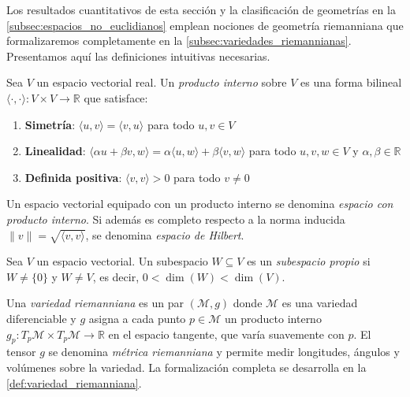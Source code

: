 Los resultados cuantitativos de esta sección y la clasificación de geometrías en la \autoref{subsec:espacios_no_euclidianos} emplean nociones de geometría riemanniana que formalizaremos completamente en la \autoref{subsec:variedades_riemannianas}. Presentamos aquí las definiciones intuitivas necesarias.

\begin{definition}\label{def:producto_interno}
Sea $V$ un espacio vectorial real. Un \textit{producto interno} sobre $V$ es una forma bilineal $\langle \cdot, \cdot \rangle: V \times V \to \mathbb{R}$ que satisface:
\begin{enumerate}
	\item \textbf{Simetría}: $\langle u, v \rangle = \langle v, u \rangle$ para todo $u, v \in V$
	\item \textbf{Linealidad}: $\langle \alpha u + \beta v, w \rangle = \alpha \langle u, w \rangle + \beta \langle v, w \rangle$ para todo $u, v, w \in V$ y $\alpha, \beta \in \mathbb{R}$
	\item \textbf{Definida positiva}: $\langle v, v \rangle > 0$ para todo $v \neq 0$
\end{enumerate}
Un espacio vectorial equipado con un producto interno se denomina \textit{espacio con producto interno}. Si además es completo respecto a la norma inducida $\|v\| = \sqrt{\langle v, v \rangle}$, se denomina \textit{espacio de Hilbert}.
\end{definition}

\begin{definition}\label{def:subespacio_propio}
Sea $V$ un espacio vectorial. Un subespacio $W \subseteq V$ es un \textit{subespacio propio} si $W \neq \{0\}$ y $W \neq V$, es decir, $0 < \dim(W) < \dim(V)$.
\end{definition}

\begin{definition}\label{def:variedad_riemanniana_preliminar}
Una \textit{variedad riemanniana} es un par $(\mathcal{M}, g)$ donde $\mathcal{M}$ es una variedad diferenciable y $g$ asigna a cada punto $p \in \mathcal{M}$ un producto interno $g_p: T_p\mathcal{M} \times T_p\mathcal{M} \to \mathbb{R}$ en el espacio tangente, que varía suavemente con $p$. El tensor $g$ se denomina \textit{métrica riemanniana} y permite medir longitudes, ángulos y volúmenes sobre la variedad. La formalización completa se desarrolla en la \autoref{def:variedad_riemanniana}.
\end{definition}

